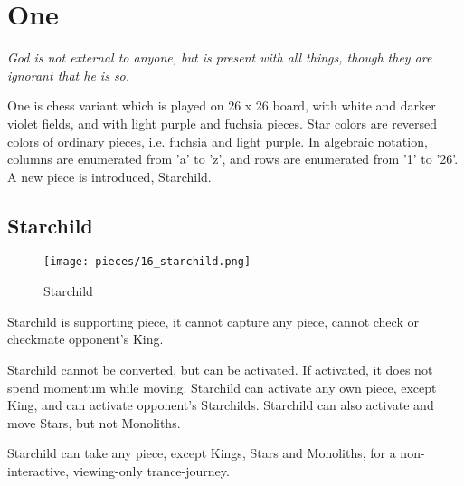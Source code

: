 

\chapter*{One}

\begin{flushright}
\parbox{0.8\textwidth}{
\emph{God is not external to anyone, but is present with all things, though
they are ignorant that he is so. \\
 } }
\end{flushright}

\noindent
One is chess variant which is played on 26 x 26 board, with white and
darker violet fields, and with light purple and fuchsia pieces. Star
colors are reversed colors of ordinary pieces, i.e. fuchsia and light
purple. In algebraic notation, columns are enumerated from 'a' to 'z',
and rows are enumerated from '1' to '26'. A new piece is introduced,
Starchild.

\clearpage %

\section*{Starchild}

\noindent
\begin{wrapfigure}[11]{l}{0.4\textwidth}
\centering
\texttt{[image: pieces/16\_starchild.png]}
\caption{Starchild}
\label{fig:16_starchild}
\end{wrapfigure}
Starchild is supporting piece, it cannot capture any piece, cannot check or checkmate
opponent's King.

Starchild cannot be converted, but can be activated. If activated, it does not spend
momentum while moving. Starchild can activate any own piece, except King, and can
activate opponent's Starchilds. Starchild can also activate and move Stars, but not
Monoliths.

Starchild can take any piece, except Kings, Stars and Monoliths, for a non-interactive,
viewing-only trance-journey.

